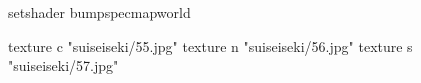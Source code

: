 setshader bumpspecmapworld

    texture c "suiseiseki/55.jpg"
    texture n "suiseiseki/56.jpg"
    texture s "suiseiseki/57.jpg"

